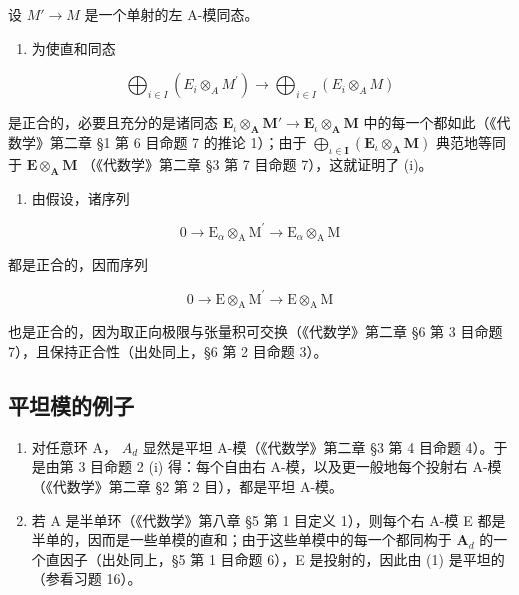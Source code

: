 设 \(M' \to M\) 是一个单射的左 A-模同态。

\begin{enumerate}
\def\labelenumi{(\roman{enumi})}
\tightlist
\item
  为使直和同态
\end{enumerate}

\[
\bigoplus_ {i \in I} \left(E _ {i} \otimes_ {A} M ^ {\prime}\right)\rightarrow \bigoplus_ {i \in I} \left(E _ {i} \otimes_ {A} M\right)
\]

是正合的，必要且充分的是诸同态 \(\mathbf{E}_{\iota} \otimes_{\mathbf{A}} \mathbf{M}' \to \mathbf{E}_{\iota} \otimes_{\mathbf{A}} \mathbf{M}\) 中的每一个都如此（《代数学》第二章 §1 第 6 目命题 7 的推论 1）；由于 \(\bigoplus_{\iota \in \mathbf{I}} (\mathbf{E}_{\iota} \otimes_{\mathbf{A}} \mathbf{M})\) 典范地等同于 \(\mathbf{E} \otimes_{\mathbf{A}} \mathbf{M}\) （《代数学》第二章 §3 第 7 目命题 7），这就证明了 (i)。

\begin{enumerate}
\def\labelenumi{(\roman{enumi})}
\setcounter{enumi}{1}
\tightlist
\item
  由假设，诸序列
\end{enumerate}

\[
0 \rightarrow \mathrm{E} _ {\alpha} \otimes_ {\mathrm{A}} \mathrm{M} ^ {\prime} \rightarrow \mathrm{E} _ {\alpha} \otimes_ {\mathrm{A}} \mathrm{M}
\]

都是正合的，因而序列

\[
0 \rightarrow \mathrm{E} \otimes_ {\mathrm{A}} \mathrm{M} ^ {\prime} \rightarrow \mathrm{E} \otimes_ {\mathrm{A}} \mathrm{M}
\]

也是正合的，因为取正向极限与张量积可交换（《代数学》第二章 §6 第 3 目命题 7），且保持正合性（出处同上，§6 第 2 目命题 3）。

\subsection{平坦模的例子}

\begin{enumerate}
\def\labelenumi{(\arabic{enumi})}
\item
  对任意环 A， \(A_{d}\) 显然是平坦 A-模（《代数学》第二章 §3 第 4 目命题 4）。于是由第 3 目命题 2 (i) 得：每个自由右 A-模，以及更一般地每个投射右 A-模（《代数学》第二章 §2 第 2 目），都是平坦 A-模。
\item
  若 A 是半单环（《代数学》第八章 §5 第 1 目定义 1），则每个右 A-模 E 都是半单的，因而是一些单模的直和；由于这些单模中的每一个都同构于 \(\mathbf{A}_d\) 的一个直因子（出处同上，§5 第 1 目命题 6），E 是投射的，因此由 (1) 是平坦的（参看习题 16）。
\end{enumerate}


